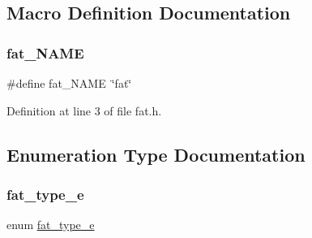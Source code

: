 \subsection{Macro Definition Documentation}
\mbox{\label{a00158_a4f5595e812b05fcd57804005edfa68a2_a4f5595e812b05fcd57804005edfa68a2}} 
\subsubsection{\texorpdfstring{fat\+\_\+\+N\+A\+ME}{fat\_NAME}}
{\footnotesize\ttfamily \#define fat\+\_\+\+N\+A\+ME~\char`\"{}fat\char`\"{}}



Definition at line 3 of file fat.\+h.



\subsection{Enumeration Type Documentation}
\mbox{\label{a00158_a1d614cff279bd01b56283ae2e9bad146_a1d614cff279bd01b56283ae2e9bad146}} 
\subsubsection{\texorpdfstring{fat\+\_\+type\+\_\+e}{fat\_type\_e}}
{\footnotesize\ttfamily enum \hyperlink{a00158_a1d614cff279bd01b56283ae2e9bad146_a1d614cff279bd01b56283ae2e9bad146}{fat\+\_\+type\+\_\+e}}

